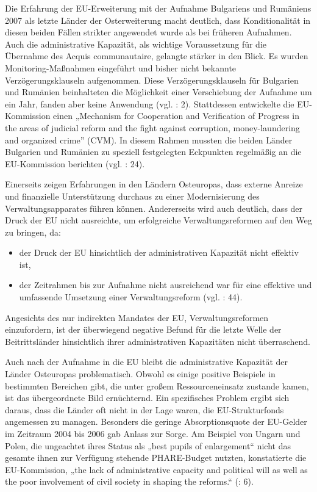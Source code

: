 Die Erfahrung der EU-Erweiterung mit der Aufnahme Bulgariens und Rumäniens 2007 als letzte Länder der Osterweiterung macht deutlich, dass Konditionalität in diesen beiden Fällen strikter angewendet wurde als bei früheren Aufnahmen. Auch die administrative Kapazität, als wichtige Voraussetzung für die Übernahme des Acquis communautaire, gelangte stärker in den Blick. Es wurden Monitoring-Maßnahmen eingeführt und bisher nicht bekannte Verzögerungsklauseln aufgenommen. Diese Verzögerungsklauseln für Bulgarien und Rumänien beinhalteten die Möglichkeit einer Verschiebung der Aufnahme um ein Jahr, fanden aber keine Anwendung (vgl. \cite{phinnemore}: 2). Stattdessen entwickelte die EU-Kommission einen „Mechanism for Cooperation and Verification of Progress in the areas of judicial reform and the fight against corruption, money-laundering and organized crime” (CVM). In diesem Rahmen mussten die beiden Länder Bulgarien und Rumänien zu speziell festgelegten Eckpunkten regelmäßig an die EU-Kommission berichten (vgl. \cite{summa}: 24). 
\par
Einerseits zeigen Erfahrungen in den Ländern Osteuropas, dass externe Anreize und finanzielle Unterstützung durchaus zu einer Modernisierung des Verwaltungsapparates führen können. Andererseits wird auch deutlich, dass der Druck der EU nicht ausreichte, um erfolgreiche Verwaltungsreformen auf den Weg zu bringen, da:
\begin{itemize}
\item der Druck der EU hinsichtlich der administrativen Kapazität nicht effektiv ist, 
\item der Zeitrahmen bis zur Aufnahme nicht ausreichend war für eine effektive und umfassende Umsetzung einer Verwaltungsreform (vgl. \cite{verheijen06}: 44).
\end{itemize}
Angesichts des nur indirekten Mandates der EU, Verwaltungsreformen einzufordern, ist der überwiegend negative Befund für die letzte Welle der Beitrittsländer hinsichtlich ihrer administrativen Kapazitäten nicht überraschend.\par
Auch nach der Aufnahme in die EU bleibt die administrative Kapazität der Länder Osteuropas problematisch. Obwohl es einige positive Beispiele in bestimmten Bereichen gibt, die unter großem Ressourceneinsatz zustande kamen, ist das übergeordnete Bild ernüchternd. Ein spezifisches Problem ergibt sich daraus, dass die Länder oft nicht in der Lage waren, die EU-Strukturfonds angemessen zu managen. Besonders die geringe Absorptionsquote der EU-Gelder im Zeitraum 2004 bis 2006 gab Anlass zur Sorge. Am Beispiel von Ungarn und Polen, die ungeachtet ihres Status als „best pupils of enlargement“ nicht das gesamte ihnen zur Verfügung stehende PHARE-Budget nutzten, konstatierte die EU-Kommission, „the lack of administrative capacity and political will as well as the poor involvement of civil society in shaping the reforms.“ (\cite{tulmets06}: 6).\par
